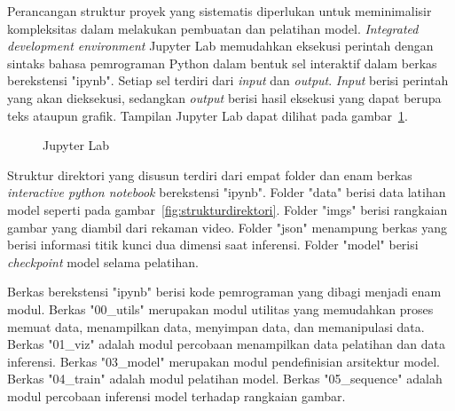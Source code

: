 Perancangan struktur proyek yang sistematis diperlukan untuk meminimalisir kompleksitas dalam
melakukan pembuatan dan pelatihan model. \textit{Integrated development environment} Jupyter Lab
memudahkan eksekusi perintah dengan sintaks bahasa pemrograman Python dalam bentuk sel interaktif
dalam berkas berekstensi "ipynb". Setiap sel terdiri dari
\textit{input} dan \textit{output}. \textit{Input} berisi perintah yang akan dieksekusi, sedangkan
\textit{output} berisi hasil eksekusi yang dapat berupa teks ataupun grafik. Tampilan Jupyter Lab
dapat dilihat pada gambar~\ref{fig:jupyterlab}.

\begin{figure}[htbp]
    \begin{center}
    \end{center}
    \vspace{-20pt}
    \captionsetup{labelfont=bf, textfont=bf}
    \caption{Jupyter Lab}
    \vspace{-10pt}
    \captionsetup{labelfont=md, textfont=md}
    \label{fig:jupyterlab}
\end{figure}


Struktur direktori yang disusun terdiri dari empat folder dan enam berkas \textit{interactive python notebook}
berekstensi "ipynb". Folder "data" berisi data latihan model seperti pada gambar~\ref{fig:strukturdirektori}.
Folder "imgs" berisi rangkaian gambar yang
diambil dari rekaman video. Folder "json" menampung berkas yang berisi informasi titik kunci dua dimensi saat
inferensi. Folder "model" berisi \textit{checkpoint} model selama pelatihan.

Berkas berekstensi "ipynb" berisi kode pemrograman yang dibagi menjadi enam modul.
Berkas "00\_utils" merupakan modul utilitas yang memudahkan proses memuat data, menampilkan data, menyimpan data, dan memanipulasi data.
Berkas "01\_viz" adalah modul percobaan menampilkan data pelatihan dan data inferensi.
Berkas "03\_model" merupakan modul pendefinisian arsitektur model.
Berkas "04\_train" adalah modul pelatihan model.
Berkas "05\_sequence" adalah modul percobaan inferensi model terhadap rangkaian gambar.

